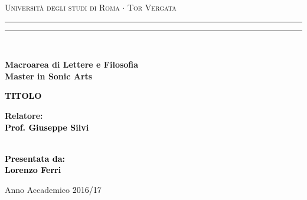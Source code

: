 \documentclass[12pt,a4paper]{report}
\begin{document}
\begin{titlepage}
\begin{center}
{\Large{\textsc{Università degli studi di Roma $\cdot$ Tor Vergata}}} 
\rule[0.1cm]{15.8cm}{0.1mm}
\rule[0.5cm]{15.8cm}{0.6mm}
\\\vspace{3mm}

{\small{\bf Macroarea di Lettere e Filosofia \\ Master in Sonic Arts}}

\end{center}

\vspace{23mm}

\begin{center}
\begin{spacing}{1.7}
\textcolor{black}{
\linespread{5}
{\LARGE{\bf 
TITOLO
}}}

\end{spacing}
\end{center}

\vspace{50mm} \par \noindent

\begin{minipage}[t]{0.47\textwidth}

{\large{\bf Relatore: \vspace{2mm}\\\textcolor{black}{
Prof. Giuseppe Silvi}\\\\

}
}
\end{minipage}
%
\hfill
%
\begin{minipage}[t]{0.47\textwidth}\raggedleft \textcolor{black}{
{\large{\bf Presentata da:
\vspace{2mm}\\
%
%
Lorenzo Ferri}}}
\end{minipage}

\vspace{17mm}

\begin{center}

{\large{%

Anno Accademico \textcolor{black}{2016/17}}}
\end{center}

\newpage\null\thispagestyle{empty}

\end{titlepage}
\end{document}
